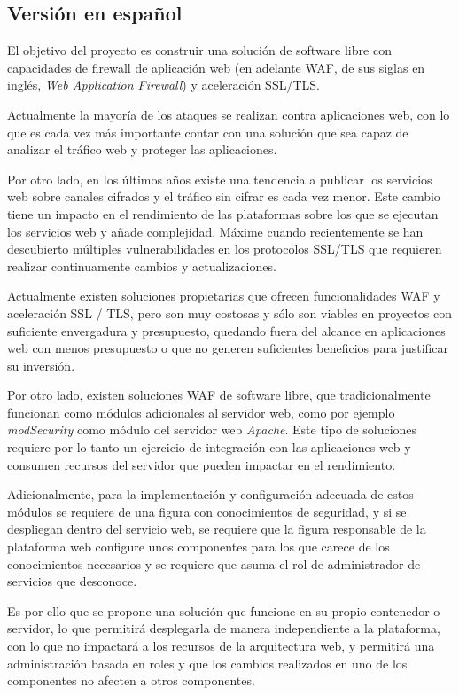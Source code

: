 \subsection{Versión en español}
\par El objetivo del proyecto es construir una solución de software libre con capacidades de firewall de aplicación web (en adelante WAF, de sus siglas en inglés, {\em Web Application Firewall}) y aceleración SSL/TLS.
\par Actualmente la mayoría de los ataques se realizan contra aplicaciones web, con lo que es cada vez más importante
contar con una solución que sea capaz de analizar el tráfico web y proteger las aplicaciones.
\par Por otro lado, en los últimos años existe una tendencia a publicar los servicios web sobre canales cifrados y el
tráfico sin cifrar es cada vez menor. Este cambio tiene un impacto en el rendimiento de las plataformas sobre los que
se ejecutan los servicios web y añade complejidad. Máxime cuando recientemente se han descubierto múltiples
vulnerabilidades en los protocolos SSL/TLS que requieren realizar continuamente cambios y actualizaciones.
\par Actualmente existen soluciones propietarias que ofrecen funcionalidades WAF y aceleración SSL / TLS, pero son muy
costosas y sólo son viables en proyectos con suficiente envergadura y presupuesto, quedando fuera del alcance en
aplicaciones web con menos presupuesto o que no generen suficientes beneficios para justificar su inversión.
\par Por otro lado, existen soluciones WAF de software libre, que tradicionalmente funcionan como módulos adicionales
al servidor web, como por ejemplo {\em modSecurity} como módulo del servidor web {\em Apache}. Este tipo de
soluciones requiere por lo tanto un ejercicio de integración con las aplicaciones web y consumen recursos del
servidor que pueden impactar en el rendimiento.
\par Adicionalmente, para la implementación y configuración adecuada de estos módulos se requiere de una figura con
conocimientos de seguridad, y si se despliegan dentro del servicio web, se requiere que la figura responsable de la
plataforma web configure unos componentes para los que carece de los conocimientos necesarios y se requiere que asuma
el rol de administrador de servicios que desconoce.
\par Es por ello que se propone una solución que funcione en su propio contenedor o servidor, lo
que permitirá desplegarla de manera independiente a la plataforma, con lo que no impactará a los recursos de la
arquitectura web, y permitirá una administración basada en roles y que los cambios realizados en uno de los
componentes no afecten a otros componentes.

